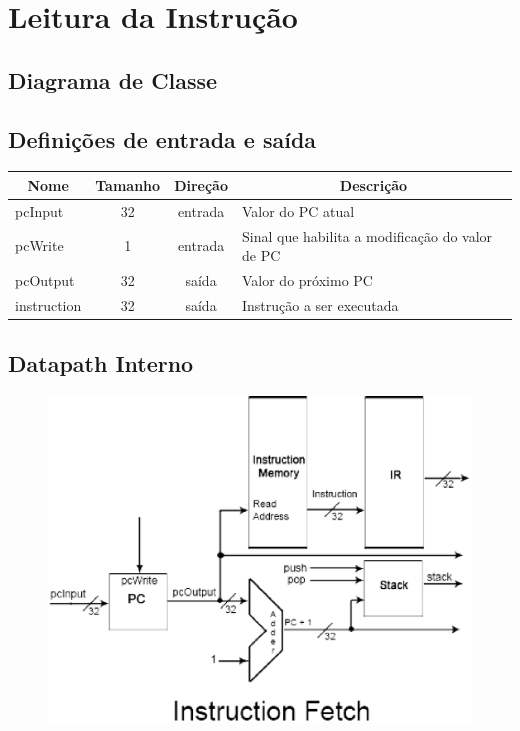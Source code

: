 \section{Leitura da Instrução}
	\subsection{Diagrama de Classe}
  \begin{figure}[H]
    
  \end{figure}
		
		\subsection{Definições de entrada e saída}
		
	\begin{center}
		\begin{longtable}[pos]{| l | c | c | m{7cm} |} \hline
			\multicolumn{1}{|c|}{\cellcolor[gray]{0.9}\textbf{Nome}} & 
			\multicolumn{1}{c|}{\cellcolor[gray]{0.9}\textbf{Tamanho}} & 
			\multicolumn{1}{c|}{\cellcolor[gray]{0.9}\textbf{Direção}} &
			\multicolumn{1}{c|}{\cellcolor[gray]{0.9}\textbf{Descrição}} \\ \hline
			\endhead
			\hline
			\endlastfoot
			pcInput & 32 & entrada & Valor do PC atual\\ \hline
			pcWrite & 1 & entrada & Sinal que habilita a modificação do valor de PC \\ \hline
			pcOutput & 32 & saída & Valor do próximo PC \\ \hline
			instruction & 32 & saída & Instrução a ser executada \\ \hline
			
		\end{longtable}
	\end{center}
	
	\subsection{Datapath Interno}
	\begin{figure}[htpb!]
		\begin{center}
		\includegraphics[scale=0.5]{./datapath/step1.eps}
		\end{center}
	\end{figure}
	